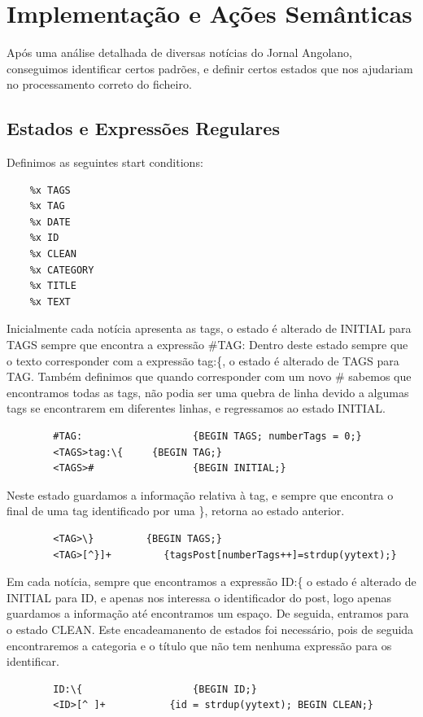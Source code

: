 \documentclass[25pt]{article}
\begin{document}
    \section{Implementação e Ações Semânticas}
    Após uma análise detalhada de diversas notícias do Jornal Angolano, conseguimos identificar certos padrões, e definir certos estados que nos
    ajudariam no processamento correto do ficheiro. 
    \subsection{Estados e Expressões Regulares}
    Definimos as seguintes start conditions:
    \begin{verbatim}
    %x TAGS
    %x TAG
    %x DATE
    %x ID
    %x CLEAN
    %x CATEGORY
    %x TITLE
    %x TEXT
    \end{verbatim}
    Inicialmente cada notícia apresenta as tags, o estado é alterado de INITIAL para TAGS sempre que encontra a expressão \#TAG:
    Dentro deste estado sempre que o texto corresponder com a expressão tag:\{, o estado é alterado de TAGS para TAG.
    Também definimos que quando corresponder com um novo \# sabemos que encontramos todas as tags, não podia ser uma quebra de linha
    devido a algumas tags se encontrarem em diferentes linhas, e regressamos ao estado INITIAL.
    \begin{verbatim}
        #TAG:   		        {BEGIN TAGS; numberTags = 0;}
        <TAGS>tag:\{     {BEGIN TAG;}
        <TAGS># 		        {BEGIN INITIAL;}
    \end{verbatim}
    Neste estado guardamos a informação relativa à tag, e sempre que encontra o final de uma tag identificado por uma \}, retorna
    ao estado anterior.
    \begin{verbatim}
        <TAG>\}   	    {BEGIN TAGS;}
        <TAG>[^}]+ 		   {tagsPost[numberTags++]=strdup(yytext);}
    \end{verbatim}
    Em cada notícia, sempre que encontramos a expressão ID:\{ o estado é alterado de INITIAL para ID, e apenas nos interessa o identificador do post, 
    logo apenas guardamos a informação até encontramos um espaço. De seguida, entramos para o estado CLEAN. Este encadeamanento
    de estados foi necessário, pois de seguida encontraremos a categoria e o título que não tem nenhuma expressão para os identificar.
    \begin{verbatim}
        ID:\{			        {BEGIN ID;}
        <ID>[^ ]+		    {id = strdup(yytext); BEGIN CLEAN;}
    \end{verbatim}
\end{document}
